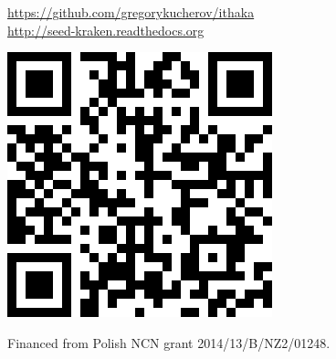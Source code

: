 \documentclass[portrait,final,a0paper,fontscale=0.277]{baposter}
\begin{document}
\begin{poster}
{ \vspace{-1.5em}
 
 \hspace{-2.0em}
  \begin{minipage}{\textwidth}
  \begin{minipage}{0.80\linewidth}
   {\smaller 
  \url{https://github.com/gregorykucherov/ithaka}\\
  \url{http://seed-kraken.readthedocs.org} 
   }
  \end{minipage}\hfill%
  \begin{minipage}{0.20\linewidth}
  \hfill\includegraphics[width=\linewidth]{images/qrcode-ithaka.png}
  \end{minipage}
  \end{minipage}
  Financed from Polish NCN grant 2014/13/B/NZ2/01248.
   \vspace{0.3em}
  }



\end{poster}
\end{document}
